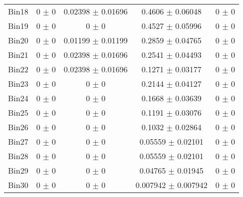\begin{tabular}{@{\extracolsep{4pt}}lcccc@{}}
     Bin18 & 0 $\pm$ 0 & 0.02398 $\pm$ 0.01696 & 0.4606 $\pm$ 0.06048 & 0 $\pm$ 0 \\ 
     Bin19 & 0 $\pm$ 0 & 0 $\pm$ 0 & 0.4527 $\pm$ 0.05996 & 0 $\pm$ 0 \\ 
     Bin20 & 0 $\pm$ 0 & 0.01199 $\pm$ 0.01199 & 0.2859 $\pm$ 0.04765 & 0 $\pm$ 0 \\ 
     Bin21 & 0 $\pm$ 0 & 0.02398 $\pm$ 0.01696 & 0.2541 $\pm$ 0.04493 & 0 $\pm$ 0 \\ 
     Bin22 & 0 $\pm$ 0 & 0.02398 $\pm$ 0.01696 & 0.1271 $\pm$ 0.03177 & 0 $\pm$ 0 \\ 
     Bin23 & 0 $\pm$ 0 & 0 $\pm$ 0 & 0.2144 $\pm$ 0.04127 & 0 $\pm$ 0 \\ 
     Bin24 & 0 $\pm$ 0 & 0 $\pm$ 0 & 0.1668 $\pm$ 0.03639 & 0 $\pm$ 0 \\ 
     Bin25 & 0 $\pm$ 0 & 0 $\pm$ 0 & 0.1191 $\pm$ 0.03076 & 0 $\pm$ 0 \\ 
     Bin26 & 0 $\pm$ 0 & 0 $\pm$ 0 & 0.1032 $\pm$ 0.02864 & 0 $\pm$ 0 \\ 
     Bin27 & 0 $\pm$ 0 & 0 $\pm$ 0 & 0.05559 $\pm$ 0.02101 & 0 $\pm$ 0 \\ 
     Bin28 & 0 $\pm$ 0 & 0 $\pm$ 0 & 0.05559 $\pm$ 0.02101 & 0 $\pm$ 0 \\ 
     Bin29 & 0 $\pm$ 0 & 0 $\pm$ 0 & 0.04765 $\pm$ 0.01945 & 0 $\pm$ 0 \\ 
     Bin30 & 0 $\pm$ 0 & 0 $\pm$ 0 & 0.007942 $\pm$ 0.007942 & 0 $\pm$ 0 \\ 
\hline\hline
  \end{tabular}
